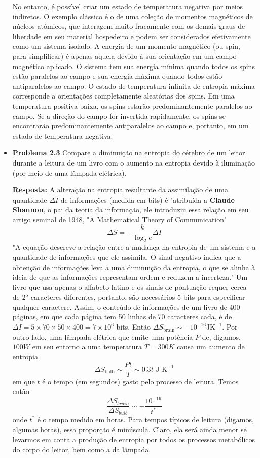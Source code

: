 \documentclass[12pt]{article}
\begin{document}
\begin{itemize}
No entanto, é possível criar um estado de temperatura negativa por meios indiretos. O exemplo clássico é o de uma coleção de momentos magnéticos de núcleos atômicos, que interagem muito fracamente com os demais graus de liberdade em seu material hospedeiro e podem ser considerados efetivamente como um sistema isolado. A energia de um momento magnético (ou spin, para simplificar) é apenas aquela devido à sua orientação em um campo magnético aplicado. O sistema tem sua energia mínima quando todos os spins estão paralelos ao campo e sua energia máxima quando todos estão antiparalelos ao campo. O estado de temperatura infinita de entropia máxima corresponde a orientações completamente aleatórias dos spins. Em uma temperatura positiva baixa, os spins estarão predominantemente paralelos ao campo. Se a direção do campo for invertida rapidamente, os spins se encontrarão predominantemente antiparalelos ao campo e, portanto, em um estado de temperatura negativa.
     
     \item \textbf{Problema 2.3} Compare a diminuição na entropia do cérebro de um leitor durante a leitura de um livro com o aumento na entropia devido à iluminação (por meio de uma lâmpada elétrica).

\textbf{Resposta:} A alteração na entropia resultante da assimilação de uma quantidade $\Delta I$ de informações (medida em bits) é "atribuída a \textbf{Claude Shannon}, o pai da teoria da informação, ele introduziu essa relação em seu artigo seminal de 1948, "A Mathematical Theory of Communication"
\[
\Delta S = -\frac{k}{\log_{2} e} \Delta I
\]
"A equação descreve a relação entre a mudança na entropia de um sistema e a quantidade de informações que ele assimila. O sinal negativo indica que a obtenção de informações leva a uma diminuição da entropia, o que se alinha à ideia de que as informações representam ordem e reduzem a incerteza."
Um livro que usa apenas o alfabeto latino e os sinais de pontuação requer cerca de $2^5$ caracteres diferentes, portanto, são necessários 5 bits para especificar qualquer caractere. Assim, o conteúdo de informações de um livro de 400 páginas, em que cada página tem 50 linhas de 70 caracteres cada, é de $\Delta I = 5×70×50×400 = 7×10^6$ bits. Então $\Delta S_\text{brain} \sim -10^{−16} \text{JK}^{−1}$. Por outro lado, uma lâmpada elétrica que emite uma potência $P$ de, digamos, $100 W$ em seu entorno a uma temperatura $T = 300 K$ causa um aumento de entropia 
\[
\Delta S_{\text{bulb}} \sim \frac{Pt}{T} \sim 0.3t \text{ J K}^{-1}
\]
em que $t$ é o tempo (em segundos) gasto pelo processo de leitura. Temos então
\[
\frac{\Delta S_{brain}}{\Delta S_{bulb}} \sim - \frac{10^{-19}}{t^*}
\]
onde $t^*$ é o tempo medido em horas. Para tempos típicos de leitura (digamos, algumas horas), essa proporção é minúscula. Claro, ela será ainda menor se levarmos em conta a produção de entropia por todos os processos metabólicos do corpo do leitor, bem como a da lâmpada. 


\end{itemize}
\end{document}
